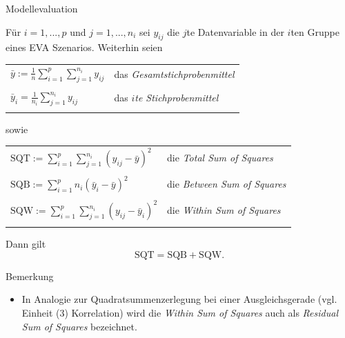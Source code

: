 \documentclass[
  8pt,
  ignorenonframetext,
]{beamer}
\providecommand{\tightlist}{%
  \setlength{\itemsep}{0pt}\setlength{\parskip}{0pt}}
\begin{document}
\begin{frame}{Modellevaluation}
\protect\hypertarget{modellevaluation-1}{}
\footnotesize
{}
\begin{theorem}
\justifying
\normalfont
Für $i = 1,...,p$ und $j = 1,...,n_i$ sei $y_{ij}$ die $j$te Datenvariable in der
$i$ten Gruppe eines EVA Szenarios. Weiterhin seien
\center
\vspace{1mm}
\begin{tabular}{ll}
$\bar{y} := \frac{1}{n}\sum_{i=1}^p \sum_{j=1}^{n_i} y_{ij}$         & das \textit{Gesamtstichprobenmittel}  \\\\
$\bar{y}_i =\frac{1}{n_i}\sum_{j=1}^{n_i} y_{ij}$                    & das \textit{$i$te Stichprobenmittel}  \\\\
\end{tabular}
\vspace{1mm}
\flushleft
sowie

\center
\vspace{1mm}
\begin{tabular}{ll}
$\mbox{SQT} := \sum_{i=1}^p \sum_{j=1}^{n_i} (y_{ij}-\bar{y})^{2}$   & die \textit{Total Sum of Squares}   \\\\
$\mbox{SQB} := \sum_{i=1}^p n_i(\bar{y}_i-\bar{y})^{2}$              & die \textit{Between Sum of Squares} \\\\
$\mbox{SQW} := \sum_{i=1}^p \sum_{j=1}^{n_i} (y_{ij}-\bar{y}_i)^{2}$ & die \textit{Within Sum of Squares}  \\\\
\end{tabular}
\vspace{1mm}
\flushleft
Dann gilt
\begin{equation}
\mbox{SQT} = \mbox{SQB} + \mbox{SQW}.
\end{equation}
\end{theorem}
\vspace{-2mm}

Bemerkung

\begin{itemize}
\tightlist
\item
  \justifying In Analogie zur Quadratsummenzerlegung bei einer
  Ausgleichsgerade (vgl. Einheit (3) Korrelation) wird die \emph{Within
  Sum of Squares} auch als \emph{Residual Sum of Squares} bezeichnet.
\end{itemize}
\end{frame}
\end{document}
